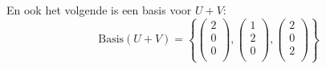 \documentclass[12pt, a4paper]{article}
\begin{document}
\begin{enumerate}[(a.)]
En ook het volgende is een basis voor $U + V$:
\begin{equation}
    \text{Basis}(U + V) =
    \left\{ 
        \begin{pmatrix}
            2 \\
            0 \\
            0 \\
        \end{pmatrix}
        ,
        \begin{pmatrix}
            1 \\
            2 \\
            0 \\
        \end{pmatrix}
        ,
        \begin{pmatrix}
            2 \\
            0 \\
            2 \\
        \end{pmatrix}
    \right\}
\end{equation}
\end{enumerate}
\end{document}
